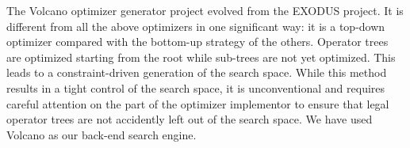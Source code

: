 The Volcano optimizer generator project \cite{Grae90b} evolved from the
EXODUS project.  It is different from all the above optimizers in one
significant way: it is a top-down optimizer compared with the bottom-up
strategy of the others.  Operator trees are optimized starting from the
root while sub-trees are not yet optimized.  This leads to a
constraint-driven generation of the search space.  While this method
results in a tight control of the search space, it is unconventional
and requires careful attention on the part of the optimizer implementor
to ensure that legal operator trees are not accidently left out of
the search space.  We have used Volcano as our back-end search engine.
